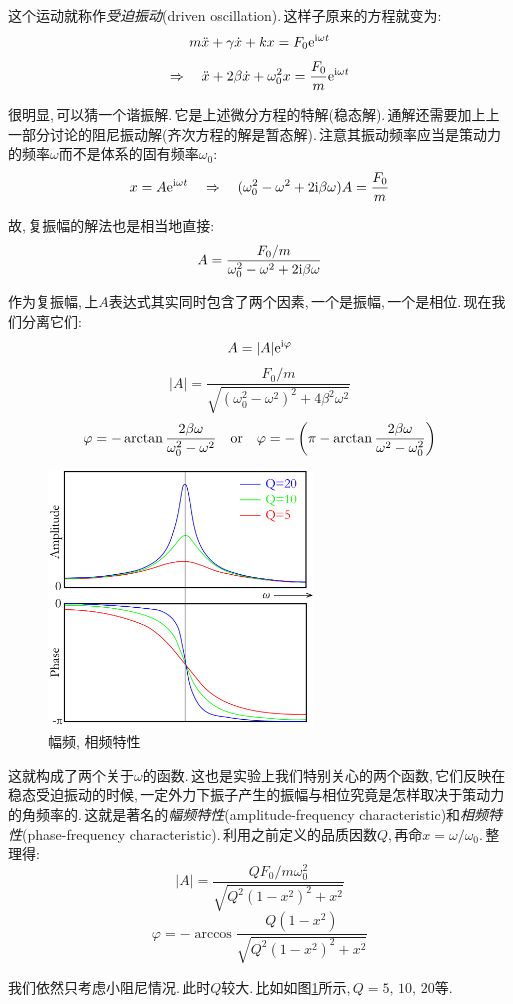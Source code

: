 这个运动就称作\emph{受迫振动}(driven oscillation).\,这样子原来的方程就变为:
\[m\ddot{x}+\gamma\dot{x}+kx=F_0{\rm e}^{{\rm i}\omega t}\]
\[\Rightarrow\quad \ddot{x}+2\beta\dot{x}+\omega_0^2 x=\frac{F_0}{m}{\rm e}^{{\rm i}\omega t}\]

很明显,\,可以猜一个谐振解.\,它是上述微分方程的特解(稳态解).\,通解还需要加上上一部分讨论的阻尼振动解(齐次方程的解是暂态解).\,注意其振动频率应当是策动力的频率$\omega$而不是体系的固有频率$\omega_0$:
\[x=A{\rm e}^{{\rm i}\omega t}\quad \Rightarrow \quad (\omega_0^2-\omega^2+2{\rm i}\beta\omega)A=\frac{F_0}{m}\]

故,\,复振幅的解法也是相当地直接:
\[A=\frac{F_0/m}{\omega_0^2-\omega^2+2{\rm i}\beta\omega}\]


作为复振幅,\,上$A$表达式其实同时包含了两个因素,\,一个是振幅,\,一个是相位.\,现在我们分离它们:
\[A=|A|{\rm e}^{{\rm i} \varphi}\]
\[|A|=\frac{F_0/m}{\sqrt{(\omega_0^2-\omega^2)^2+4\beta^2\omega^2}}\]
\[\varphi=-\arctan\frac{2\beta\omega}{\omega_0^2-\omega^2}\quad {\rm or} \quad \varphi=-\left(\pi-\arctan\frac{2\beta\omega}{\omega^2-\omega_0^2}\right)\]

\begin{figure}
\centering
\includegraphics[width=7cm]{image/6-3-4.png}
\caption{幅频, 相频特性}\label{6-3-4}
\end{figure}
这就构成了两个关于$\omega$的函数.\,这也是实验上我们特别关心的两个函数,\,它们反映在稳态受迫振动的时候,\,一定外力下振子产生的振幅与相位究竟是怎样取决于策动力的角频率的.\,这就是著名的\emph{幅频特性}(amplitude-frequency characteristic)和\emph{相频特性}(phase-frequency characteristic).\,利用之前定义的品质因数$Q$,\,再命$x=\omega/\omega_0$.\,整理得:
\[|A|=\frac{QF_0/m\omega_0^2}{\sqrt{Q^2(1-x^2)^2+x^2}}\]
\[\varphi=-\arccos\frac{Q (1-x^2)}{\sqrt{Q^2(1-x^2)^2+x^2}}\]


我们依然只考虑小阻尼情况.\,此时$Q$较大.\,比如如图\ref{6-3-4}所示,\,$Q=5,\,10,\,20$等.

